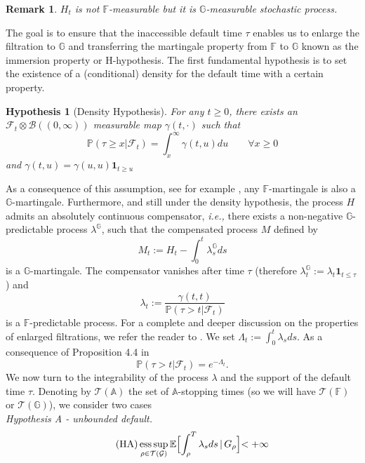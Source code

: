 \documentclass[11pt,a4paper]{article}
\theoremstyle{thmstyleone}%
\theoremstyle{thmstyletwo}%
\newtheorem{remark}{Remark}%
\theoremstyle{thmstylethree}%
\newtheorem*{hypothesis}{Hypothesis}%
\newcommand{\E}{\mathbb{E}}
\newcommand{\F}{\mathbb{F}}
\newcommand{\G}{\mathbb{G}}
\newcommand{\p}{\mathbb{P}}
\newcommand{\ind}{\mathbf{1}}
\DeclareMathOperator*{\esssup}{ess\,sup}
\begin{document}
\begin{remark}
$H_t$ is not $\mathbb F$-measurable but it is $\G$-measurable stochastic process. 
\end{remark}
The goal is to ensure that the inaccessible default time $\tau$ enables us to enlarge the filtration to $\mathbb G$ and transferring the martingale property from $\mathbb F$ to $\mathbb G$ known as the immersion property or H-hypothesis. The first fundamental hypothesis is to set the existence of a (conditional) density for the default time with a certain property.

\begin{hypothesis}[Density Hypothesis]\label{densityhyp}
For any $t\geq 0$, there exists an $\mathcal F_t\otimes \mathcal B((0,\infty))$ measurable map $\gamma(t, \cdot)$ such that
\[   
    \p(\tau \geq x | \mathcal F_t) = \int_{x}^\infty \gamma(t, u) du \qquad \forall x \geq 0
\]
and $\gamma(t, u) = \gamma(u,u) \ind_{t\geq u}$ 
\end{hypothesis}
As a consequence of this assumption, see for example \cite{bremaud1978changes, el2010happens}, any $\F$-martingale is also a $\G$-martingale. Furthermore, and still under the density hypothesis, the process $H$ admits an absolutely continuous compensator, \textit{i.e.,} there exists a non-negative $\G$-predictable process $\lambda^{\G}$, such that the compensated process $M$ defined by
\[M_t := H_t - \int_{0}^t \lambda_s^{\G} ds
\]
is a $\G$-martingale. The compensator vanishes after time $\tau$ (therefore $\lambda^{\G}_t := \lambda_t \ind_{t \leq \tau}$) and 
\[
    \lambda_t := \frac{\gamma(t,t)}{\p(\tau > t | \mathcal F_t)}
\]
is a $\F$-predictable process. For a complete and deeper discussion on the properties of enlarged filtrations, we refer the reader to \cite{Guo_2008}. We set $\Lambda_t:=\int_0^t \lambda_s ds$. As a consequence of Proposition 4.4 in \cite{el2010happens} 
\[\mathbb P(\tau>t|\mathcal F_t)=e^{-\Lambda_t}.\]
We now turn to the integrability of the process $\lambda$ and the support of the default time $\tau$. Denoting by $\mathcal{T}(\mathbb{A})$ the set of $\mathbb{A}$-stopping times (so we will have $\mathcal{T}(\F)$ or $\mathcal{T}(\G)$), we consider two cases\\

\noindent \textit{Hypothesis A - unbounded default.} 
\begin{equation} \label{H:unbounded}
    \tag{HA}
    \esssup_{\rho \in \mathcal{T}(\mathcal G)} \E\Bigl[\int_{\rho}^T \lambda_s ds \, | \,  G_{\rho}\Bigl] < + \infty
\end{equation}
\end{document}
